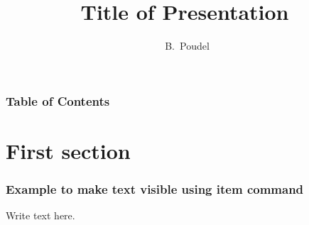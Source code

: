 \documentclass{beamer}
\title[Astroseminar Fall 2017] %
{Title of  Presentation}
\author[Poudel, Bhishan] %
{~B.~Poudel\inst{1} }
\institute[Ohio University] %
{\inst{1}%
  Department of Physics and Astronomy\\
  Ohio University
}
\date[Aug 21, 2017] %
{} %
\begin{document}
\frame{\titlepage}
\begin{frame}
\frametitle{Table of Contents}
\tableofcontents
\end{frame}
\section{First section}
\begin{frame}
  \frametitle{Example to make text visible using item command}
  Write text here.
\end{frame}
\end{document}
